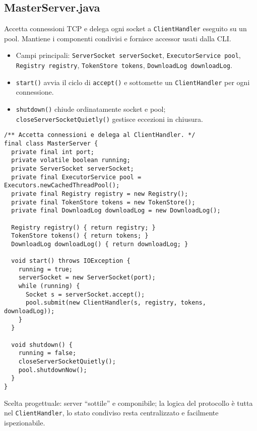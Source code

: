 \documentclass[a4paper,12pt]{article}
\begin{document}
\subsection*{MasterServer.java}
Accetta connessioni TCP e delega ogni socket a \texttt{ClientHandler} eseguito su un pool. Mantiene i componenti condivisi e fornisce accessor usati dalla CLI.
\begin{itemize}[nosep]
  \item Campi principali: \texttt{ServerSocket serverSocket}, \texttt{ExecutorService pool}, \texttt{Registry registry}, \texttt{TokenStore tokens}, \texttt{DownloadLog downloadLog}.
  \item \texttt{start()} avvia il ciclo di \texttt{accept()} e sottomette un \texttt{ClientHandler} per ogni connessione.
  \item \texttt{shutdown()} chiude ordinatamente socket e pool; \texttt{closeServerSocketQuietly()} gestisce eccezioni in chiusura.
\end{itemize}

\begin{lstlisting}
/** Accetta connessioni e delega al ClientHandler. */
final class MasterServer {
  private final int port;
  private volatile boolean running;
  private ServerSocket serverSocket;
  private final ExecutorService pool = Executors.newCachedThreadPool();
  private final Registry registry = new Registry();
  private final TokenStore tokens = new TokenStore();
  private final DownloadLog downloadLog = new DownloadLog();

  Registry registry() { return registry; }
  TokenStore tokens() { return tokens; }
  DownloadLog downloadLog() { return downloadLog; }

  void start() throws IOException {
    running = true;
    serverSocket = new ServerSocket(port);
    while (running) {
      Socket s = serverSocket.accept();
      pool.submit(new ClientHandler(s, registry, tokens, downloadLog));
    }
  }

  void shutdown() {
    running = false;
    closeServerSocketQuietly();
    pool.shutdownNow();
  }
}
\end{lstlisting}

Scelta progettuale: server “sottile” e componibile; la logica del protocollo è tutta nel \texttt{ClientHandler}, lo stato condiviso resta centralizzato e facilmente ispezionabile.
\end{document}
